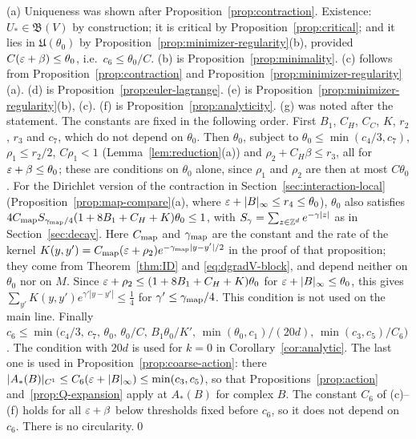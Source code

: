 (a) Uniqueness was shown after Proposition~\ref{prop:contraction}. Existence: $U_*\in\mathfrak B(V)$ by construction; it is critical by Proposition~\ref{prop:critical}; and it lies in $\mathfrak U(\theta_0)$ by Proposition~\ref{prop:minimizer-regularity}(b), provided $C(\varepsilon+\beta)\le\theta_0$, i.e.\ $c_6\le\theta_0/C$. (b) is Proposition~\ref{prop:minimality}. (c) follows from Proposition~\ref{prop:contraction} and Proposition~\ref{prop:minimizer-regularity}(a). (d) is Proposition~\ref{prop:euler-lagrange}. (e) is Proposition~\ref{prop:minimizer-regularity}(b), (c). (f) is Proposition~\ref{prop:analyticity}. (g) was noted after the statement. The constants are fixed in the following order. First $B_1$, $C_H$, $C_C$, $K$, $r_2$, $r_3$ and $c_7$, which do not depend on $\theta_0$. Then $\theta_0$, subject to $\theta_0\le\min(c_4/3,c_7)$, $\rho_1\le r_2/2$, $C\rho_1<1$ (Lemma~\ref{lem:reduction}(a)) and $\rho_2+C_H\beta\le r_3$, all for $\varepsilon+\beta\le\theta_0$; these are conditions on $\theta_0$ alone, since $\rho_1$ and $\rho_2$ are then at most $C\theta_0$. For the Dirichlet version of the contraction in Section~\ref{sec:interaction-local} (Proposition~\ref{prop:map-compare}(a), where $\varepsilon+|B|_\infty\le r_4\le\theta_0$), $\theta_0$ also satisfies $4C_{\rm map}S_{\gamma_{\rm map}/4}(1+8B_1+C_H+K)\theta_0\le1$, with $S_\gamma=\sum_{z\in\mathbb Z^d}e^{-\gamma|z|}$ as in Section~\ref{sec:decay}. Here $C_{\rm map}$ and $\gamma_{\rm map}$ are the constant and the rate of the kernel $K(y,y')=C_{\rm map}(\varepsilon+\rho_2)e^{-\gamma_{\rm map}|y-y'|/2}$ in the proof of that proposition; they come from Theorem~\ref{thm:ID} and \eqref{eq:dgradV-block}, and depend neither on $\theta_0$ nor on $M$. Since $\varepsilon+\rho_2\le(1+8B_1+C_H+K)\theta_0$ for $\varepsilon+|B|_\infty\le\theta_0$, this gives $\sum_{y'}K(y,y')e^{\gamma'|y-y'|}\le\frac14$ for $\gamma'\le\gamma_{\rm map}/4$. This condition is not used on the main line. Finally $c_6\le\min\big(c_4/3,\,c_7,\,\theta_0,\,\theta_0/C,\,B_1\theta_0/K',\,\min(\theta_0,c_1)/(20d),\,\min(c_3,c_5)/C_6\big)$. The condition with $20d$ is used for $k=0$ in Corollary~\ref{cor:analytic}. The last one is used in Proposition~\ref{prop:coarse-action}: there $|A_*(B)|_{C^1}\le C_6(\varepsilon+|B|_\infty)\le\min(c_3,c_5)$, so that Propositions~\ref{prop:action} and~\ref{prop:Q-expansion} apply at $A_*(B)$ for complex $B$. The constant $C_6$ of (c)--(f) holds for all $\varepsilon+\beta$ below thresholds fixed before $c_6$, so it does not depend on $c_6$. There is no circularity.\qed

